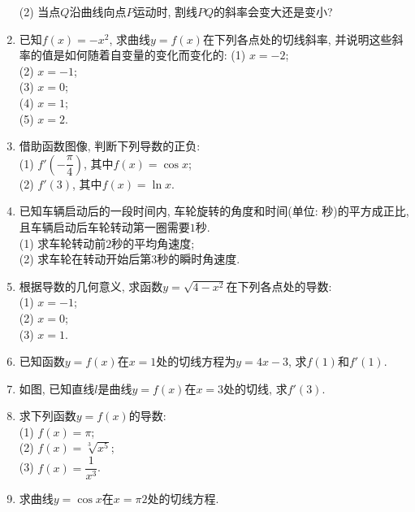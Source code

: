 \documentclass[10pt,a4paper]{article}
\begin{document}
\begin{enumerate}[1.]
(2) 当点$Q$沿曲线向点$P$运动时, 割线$PQ$的斜率会变大还是变小? 
\item 已知$f(x)=-x^2$, 求曲线$y=f(x)$在下列各点处的切线斜率, 并说明这些斜率的值是如何随着自变量的变化而变化的:
(1) $x=-2$;\\
(2) $x=-1$;\\
(3) $x=0$;\\
(4) $x=1$;\\
(5) $x=2$.
\item 借助函数图像, 判断下列导数的正负:\\
(1) $f'(-\dfrac \pi 4)$, 其中$f(x)=\cos x$;\\
(2) $f'(3)$, 其中$f(x)=\ln x$.
\item 已知车辆启动后的一段时间内, 车轮旋转的角度和时间(单位: 秒)的平方成正比, 且车辆启动后车轮转动第一圈需要$1$秒.\\
(1) 求车轮转动前$2$秒的平均角速度;\\
(2) 求车轮在转动开始后第$3$秒的瞬时角速度.
\item 根据导数的几何意义, 求函数$y=\sqrt{4-x^2}$在下列各点处的导数:\\
(1) $x=-1$;\\
(2) $x=0$;\\
(3) $x=1$.
\item 已知函数$y=f(x)$在$x=1$处的切线方程为$y=4x-3$, 求$f(1)$和$f'(1)$.
\item 如图, 已知直线$l$是曲线$y=f(x)$在$x=3$处的切线, 求$f'(3)$.
\begin{center}
\end{center}
\item 求下列函数$y=f(x)$的导数:\\
(1) $f(x)=\pi$;\\
(2) $f(x)=\sqrt[3]{x^5}$;\\
(3) $f(x)=\dfrac1{x^3}$.
\item 求曲线$y=\cos x$在$x=\pi 2$处的切线方程.

\end{enumerate}
\end{document}
